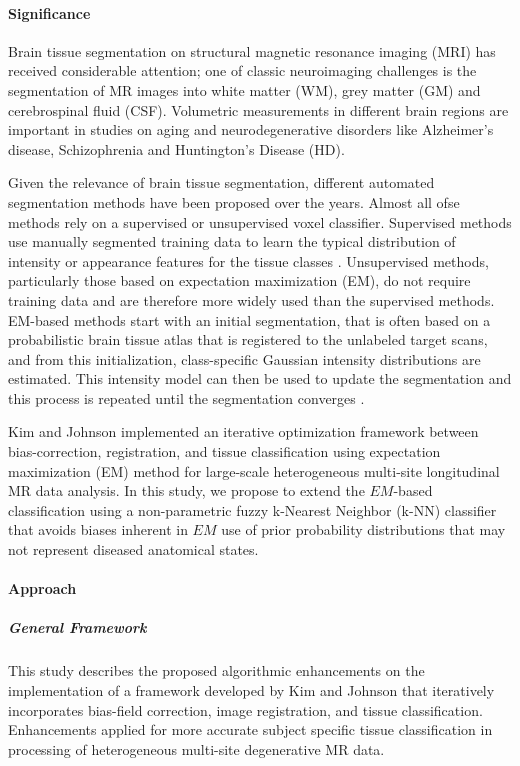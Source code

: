 \paragraph{Significance}

Brain tissue segmentation on structural magnetic resonance imaging (MRI) has received considerable attention; one of classic neuroimaging challenges is the segmentation of MR images into white matter (WM), grey matter (GM) and cerebrospinal fluid (CSF).
Volumetric measurements in different brain regions are important in studies on aging and neurodegenerative disorders \cite{vrooman2013auto} like Alzheimer's disease, Schizophrenia and Huntington's Disease (HD).

Given the relevance of brain tissue segmentation, different automated segmentation methods have been proposed over the years. Almost all ofse methods rely on a supervised or unsupervised voxel classifier. Supervised methods use manually segmented training data to learn the typical distribution of intensity or appearance features for the tissue classes \cite{Anbeek2005}. Unsupervised methods, particularly those based on expectation maximization (EM), do not require training data and are therefore more widely used than the supervised methods. EM-based methods start with an initial segmentation, that is often based on a probabilistic brain tissue atlas that is registered to the unlabeled target scans, and from this initialization, class-specific Gaussian intensity distributions are estimated. This intensity model can then be used to update the segmentation and this process is repeated until the segmentation converges \cite{vrooman2013auto}.

Kim and Johnson \cite{Kim2013} implemented an iterative optimization framework between bias-correction, registration, and tissue classification using expectation maximization (EM) method for large-scale heterogeneous multi-site longitudinal MR data analysis. In this study, we propose to extend the $EM$-based classification using a non-parametric fuzzy k-Nearest Neighbor (k-NN) classifier that avoids biases inherent in $EM$ use of prior probability distributions that may not represent diseased anatomical states.

\paragraph{Approach} %

\subparagraph{General Framework} %
This study describes the proposed algorithmic enhancements on the implementation of a framework developed by Kim and Johnson \cite{Kim2013} that iteratively incorporates bias-field correction, image registration, and tissue classification. Enhancements applied for more accurate subject specific tissue classification in processing of heterogeneous multi-site degenerative MR data.

